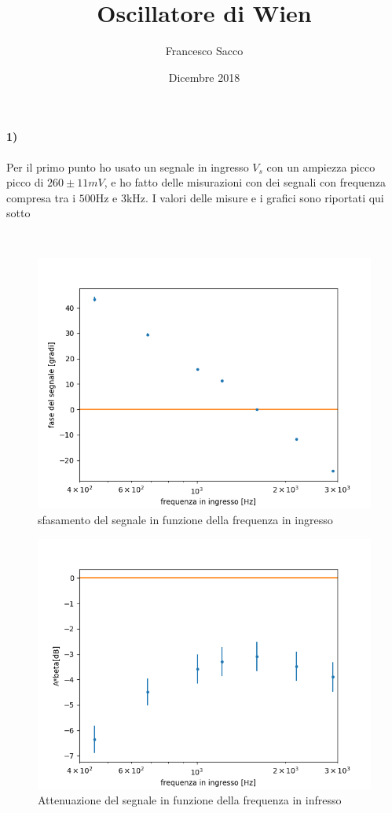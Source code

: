 \documentclass{article}
\date{Dicembre 2018}
\author{Francesco Sacco}
\title{Oscillatore di Wien}
\begin{document}
\maketitle
\paragraph{1)}
	Per il primo punto ho usato un segnale in ingresso $V_s$ con un ampiezza picco picco di $260\pm11 mV$, e ho fatto delle misurazioni con dei segnali con frequenza compresa tra i $500$Hz e $3$kHz. I valori delle misure e i grafici sono riportati qui sotto\newline
	\begin{center}
		\\
		\begin{figure}
			\centering
			\includegraphics[width=\linewidth]{figure/1.png}
			\caption{sfasamento del segnale in funzione della frequenza in ingresso}
			\label{fig:1}
		\end{figure}
		\begin{figure}
			\centering
			\includegraphics[width=\linewidth]{figure/2.png}
			\caption{Attenuazione del segnale in funzione della frequenza in infresso}
			\label{fig:2}
		\end{figure}
	\end{center}
\end{document}

